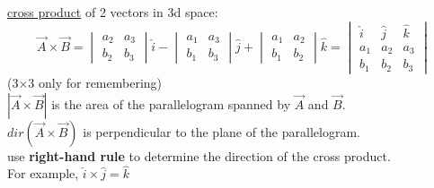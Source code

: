 \documentclass{article}
\begin{document}
\underline{cross product} of 2 vectors in 3d space:\\
\[
\overrightarrow{A}\times\overrightarrow{B}
=\begin{vmatrix}
a_2&a_3\\
b_2&b_3
\end{vmatrix}\hat{i}
-\begin{vmatrix}
a_1&a_3\\
b_1&b_3
\end{vmatrix}\hat{j}
+\begin{vmatrix}
a_1&a_2\\
b_1&b_2
\end{vmatrix}\hat{k}
=\begin{vmatrix}
\hat{i} & \hat{j} & \hat{k}\\
a_1 & a_2 & a_3\\
b_1 & b_2 & b_3
\end{vmatrix}
\](3×3 only for remembering)\\
$\left|\overrightarrow{A}\times\overrightarrow{B}\right|$
is the area of the parallelogram spanned by $\overrightarrow{A}$ and $\overrightarrow{B}$.\\
$dir(\overrightarrow{A}\times\overrightarrow{B})$
is perpendicular to the plane of the parallelogram.\\
use \textbf{right-hand rule} to determine the direction of the cross product.\\
For example, $\hat{i}\times\hat{j}=\hat{k}$\\
\end{document}
